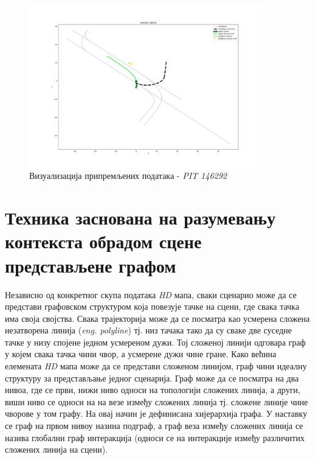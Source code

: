 \documentclass[11pt,oneside]{memoir}
\begin{document}
\begin{figure}[H]
  \includegraphics[width=0.9\textwidth]{images/scenario_PIT_146292.png}
  \caption{Визуализација припремљених података - \textit{PIT 146292}}
  \label{scenario-example-PIT-146292}
\end{figure}

\chapter{Техника заснована на разумевању контекста обрадом сцене представљене графом}
\label{chp:razrada}

Независно од конкретног скупа података \textit{HD} мапа, сваки сценарио може да се представи графовском структуром која повезује тачке на сцени, где
свака тачка има своја својства. Свака трајекторија може да се посматра као усмерена сложена незатворена линија (\textit{eng. polyline}) тј. 
низ тачака тако да су сваке две суседне тачке у низу спојене једном усмереном дужи. Тој сложеној линији одговара граф у којем свака тачка
чини чвор, а усмерене дужи чине гране. Како већина елемената \textit{HD} мапа може да се представи сложеном линијом, граф чини идеалну структуру
за представљање једног сценарија. Граф може да се посматра на два нивоа, где се први, нижи ниво односи на топологији сложених линија, а други, виши ниво 
се односи на на везе између сложених линија тј. сложене линије чине чворове у том графу. На овај начин је дефинисана хијерархија графа. 
У наставку се граф на првом нивоу назина подграф, а граф веза између сложених линија се назива глобални граф интеракција (односи се на интеракције
између различитих сложених линија на сцени).
\end{document}
